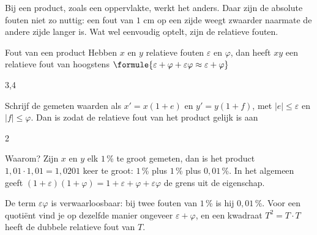 Bij een product, zoals een oppervlakte, werkt het anders. Daar zijn de absolute fouten niet zo nuttig: een fout van $1$ cm op een zijde weegt zwaarder naarmate de andere zijde langer is. Wat wel eenvoudig optelt, zijn de relatieve fouten.

\begin{theorie}
\begin{stelling}{Fout van een product}
Hebben $x$ en $y$ relatieve fouten $\varepsilon$ en $\varphi$, dan heeft $xy$ een relatieve fout van hoogstens \qquad $\formule{\varepsilon + \varphi + \varepsilon\varphi \approx \varepsilon + \varphi}$
\end{stelling}

\begin{alleenvoor}{3,4}
\begin{bewijs}
Schrijf de gemeten waarden als $x' = x(1 + e)$ en $y' = y(1 + f)$, met $|e| \leqslant \varepsilon$ en $|f| \leqslant \varphi$. Dan is
zodat de relatieve fout van het product gelijk is aan
\end{bewijs}
\end{alleenvoor}
\end{theorie}
\begin{alleenvoor}{2}

Waarom? Zijn $x$ en $y$ elk $1$\,\% te groot gemeten, dan is het product $1{,}01 \cdot 1{,}01 = 1{,}0201$ keer te groot: $1$\,\% plus $1$\,\% plus $0{,}01$\,\%. In het algemeen geeft $(1 + \varepsilon)(1 + \varphi) = 1 + \varepsilon + \varphi + \varepsilon\varphi$ de grens uit de eigenschap.
\end{alleenvoor}

De term $\varepsilon\varphi$ is verwaarloosbaar: bij twee fouten van $1$\,\% is hij $0{,}01$\,\%. Voor een quotiënt vind je op dezelfde manier ongeveer $\varepsilon + \varphi$, en een kwadraat $T^2 = T \cdot T$ heeft de dubbele relatieve fout van $T$.


